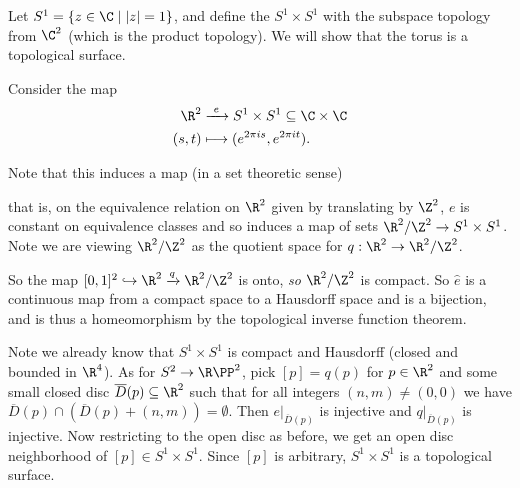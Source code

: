 \begin{example}[Torus]
    Let $S^1 = \{z \in \C \mid |z| = 1\}$, and define the  $S^1 \times S^1$ with the subspace topology from $\C^2$ (which is the product topology). We will show that the torus is a topological surface.

    Consider the map
    \begin{align*}
        \R^2 &\xrightarrow{\ e\ } S^1 \times S^1 \subseteq \C \times \C \\
        (s, t) & \longmapsto (e^{2\pi i s}, e^{2 \pi i t}).
    \end{align*}

    Note that this induces a map (in a set theoretic sense)
    \begin{center}
    \end{center}
    that is, on the equivalence relation on $\R^2$ given by translating by $\Z^2$, $e$ is constant on equivalence classes and so induces a map of sets $\R^2/\Z^2 \rightarrow S^1 \times S^1$. Note we are viewing $\R^2/\Z^2$ as the quotient space for $q: \R^2 \rightarrow \R^2/\Z^2$.

    So the map $[0, 1]^2 \hookrightarrow \R^2 \xrightarrow{q} \R^2/\Z^2$ is onto, \emph{so} $\R^2/\Z^2$ is compact. So $\hat{e}$ is a continuous map from a compact space to a Hausdorff space and is a bijection, and is thus a homeomorphism by the topological inverse function theorem.

    Note we already know that $S^1 \times S^1$ is compact and Hausdorff (closed and bounded in $\R^4$). As for $S^2 \rightarrow \R\PP^2$, pick $[p] = q(p)$ for $p \in \R^2$ and some small closed disc $\overline{D}(p) \subseteq \R^2$ such that for all integers $(n, m) \neq (0,0)$ we have $\overline{D}(p) \cap (\overline{D}(p) + (n, m)) = \emptyset$.
    Then $e|_{\overline{D}(p)}$ is injective and $q|_{\overline{D}(p)}$ is injective.
    Now restricting to the open disc as before, we get an open disc neighborhood of $[p] \in S^1 \times S^1$.
    Since $[p]$ is arbitrary, $S^1 \times S^1$ is a topological surface.


\end{example}
